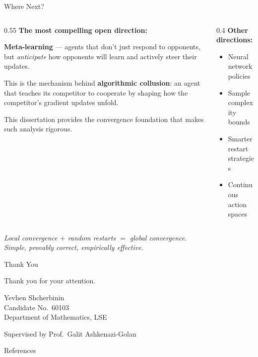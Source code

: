 \documentclass[aspectratio=169,11pt]{beamer}
\begin{document}
\begin{frame}{Where Next?}
  \begin{columns}[T]
    \begin{column}{0.55\textwidth}
      \textbf{The most compelling open direction:}

      \bigskip

      \textbf{Meta-learning} --- agents that don't just respond
      to opponents, but \emph{anticipate} how opponents will learn
      and actively steer their updates.

      \bigskip

      This is the mechanism behind \textbf{algorithmic collusion}:
      an agent that teaches its competitor to cooperate by shaping
      how the competitor's gradient updates unfold.

      \bigskip

      {\small This dissertation provides the convergence foundation
      that makes such analysis rigorous.}
    \end{column}
    \begin{column}{0.4\textwidth}
      \textbf{Other directions:}
      \begin{itemize}
        \item Neural network policies
        \item Sample complexity bounds
        \item Smarter restart strategies
        \item Continuous action spaces
      \end{itemize}
    \end{column}
  \end{columns}

  \medskip

  \begin{center}
    \emph{Local convergence $+$ random restarts $=$ global convergence.\\
    Simple, provably correct, empirically effective.}
  \end{center}
\end{frame}

\begin{frame}{Thank You}
  \begin{center}
    {\Large Thank you for your attention.}

    \bigskip\bigskip

    {\large Yevhen Shcherbinin}\\[4pt]
    Candidate No.\ 60103\\[4pt]
    Department of Mathematics, LSE

    \bigskip\bigskip

    {\small Supervised by Prof.\ Galit Ashkenazi-Golan}
  \end{center}
\end{frame}

\begin{frame}[allowframebreaks]{References}
  \small
  \nocite{giannou2022,kalogiannis2025,leung2024,anagnostides2024,foster2023,kim2021}
  
  
\end{frame}
\end{document}
